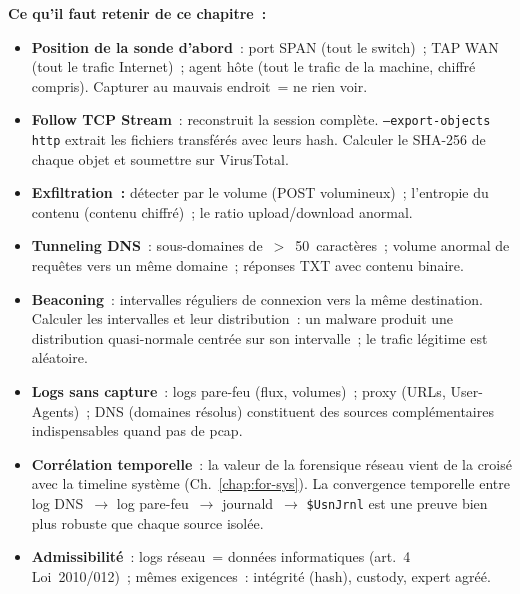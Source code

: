 \begin{boxresume}
\textbf{Ce qu'il faut retenir de ce chapitre~:}
\begin{itemize}
    \item \textbf{Position de la sonde d'abord}~: port SPAN (tout
          le switch)~; TAP WAN (tout le trafic Internet)~;
          agent hôte (tout le trafic de la machine, chiffré compris).
          Capturer au mauvais endroit~= ne rien voir.

    \item \textbf{Follow TCP Stream}~: reconstruit la session complète.
          \texttt{--export-objects http} extrait les fichiers transférés
          avec leurs hash. Calculer le SHA-256 de chaque objet et
          soumettre sur VirusTotal.

    \item \textbf{Exfiltration~:} détecter par le volume (POST
          volumineux)~; l'entropie du contenu (contenu chiffré)~;
          le ratio upload/download anormal.

    \item \textbf{Tunneling DNS}~: sous-domaines de~$>$~50~caractères~;
          volume anormal de requêtes vers un même domaine~;
          réponses TXT avec contenu binaire.

    \item \textbf{Beaconing}~: intervalles réguliers de connexion vers
          la même destination. Calculer les intervalles et leur
          distribution~: un malware produit une distribution
          quasi-normale centrée sur son intervalle~; le trafic
          légitime est aléatoire.

    \item \textbf{Logs sans capture}~: logs pare-feu (flux, volumes)~;
          proxy (URLs, User-Agents)~; DNS (domaines résolus) constituent
          des sources complémentaires indispensables quand pas de pcap.

    \item \textbf{Corrélation temporelle}~: la valeur de la forensique
          réseau vient de la croisé avec la timeline système
          (Ch.~\ref{chap:for-sys}). La convergence temporelle entre
          log DNS~$\to$ log pare-feu~$\to$ journald~$\to$
          \texttt{\$UsnJrnl} est une preuve bien plus robuste que
          chaque source isolée.

    \item \textbf{Admissibilité}~: logs réseau~= données informatiques
          (art.~4 Loi~2010/012)~; mêmes exigences~: intégrité (hash),
          custody, expert agréé.
\end{itemize}
\end{boxresume}

